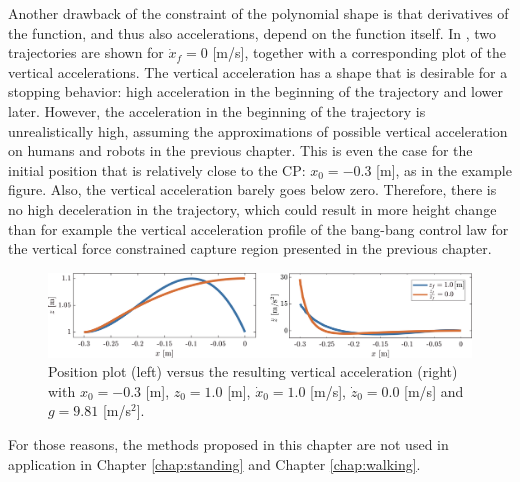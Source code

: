 Another drawback of the constraint of the polynomial shape is that derivatives of the function, and thus also accelerations, depend on the function itself. In , two trajectories are shown for $\dot{x}_f = 0$ [m/s], together with a corresponding plot of the vertical accelerations. The vertical acceleration has a shape that is desirable for a stopping behavior: high acceleration in the beginning of the trajectory and lower later. However, the acceleration in the beginning of the trajectory is unrealistically high, assuming the approximations of possible vertical acceleration on humans and robots in the previous chapter. This is even the case for the initial position that is relatively close to the \ac{CP}: $x_0=-0.3$ [m], as in the example figure. Also, the vertical acceleration barely goes below zero. Therefore, there is no high deceleration in the trajectory, which could result in more height change than for example the vertical acceleration profile of the bang-bang control law for the vertical force constrained capture region presented in the previous chapter.
\begin{figure}
\centering
\includegraphics[width=\textwidth]{STYLESTUFF/polynomialforce.png}
\caption{Position plot (left) versus the resulting vertical acceleration (right) with $x_0=-0.3$ [m], $z_0=1.0$ [m], $\dot{x}_0=1.0$ [m/s], $\dot{z}_0=0.0$ [m/s] and $g=9.81$ [m/s$^2$].}
\label{fig:polforce}
\end{figure}

For those reasons, the methods proposed in this chapter are not used in application in Chapter \ref{chap:standing} and Chapter \ref{chap:walking}.
